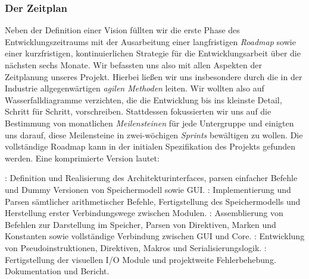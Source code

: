 
\subsubsection{Der Zeitplan}
\label{team:orga-plan-time}
\vspace{-0.2cm}

Neben der Definition einer Vision füllten wir die erste Phase des
Entwicklungszeitraums mit der Ausarbeitung einer langfristigen \emph{Roadmap}
sowie einer kurzfristigen, kontinuierlichen Strategie für die Entwicklungsarbeit
über die nächsten sechs Monate. Wir befassten uns also mit allen Aspekten der
Zeitplanung unseres Projekt. Hierbei ließen wir uns insbesondere durch die in
der Industrie allgegenwärtigen \emph{agilen Methoden} leiten. Wir wollten also
auf Wasserfalldiagramme verzichten, die die Entwicklung bis ins kleinste Detail,
Schritt für Schritt, vorschreiben. Stattdessen fokussierten wir uns auf die
Bestimmung von monatlichen \emph{Meilensteinen} für jede Untergruppe und
einigten uns darauf, diese Meilensteine in zwei-wöchigen \emph{Sprints}
bewältigen zu wollen. Die vollständige Roadmap kann in der initialen
Spezifikation des Projekts gefunden werden. Eine komprimierte Version lautet:
\begin{sitemize}{-0.35cm}
  : Definition und Realisierung des Architekturinterfaces, parsen einfacher Befehle und Dummy Versionen von Speichermodell sowie GUI.
  : Implementierung und Parsen sämtlicher arithmetischer Befehle, Fertigstellung des Speichermodells und Herstellung erster Verbindungswege zwischen Modulen.
  : Assemblierung von Befehlen zur Darstellung im Speicher, Parsen von Direktiven, Marken und Konstanten sowie vollständige Verbindung zwischen GUI und Core.
  : Entwicklung von Pseudoinstruktionen, Direktiven, Makros und Serialisierungslogik.
  : Fertigstellung der visuellen I/O Module und projektweite Fehlerbehebung.
   Dokumentation und Bericht.
  \vspace{-0.3cm}
\end{sitemize}
